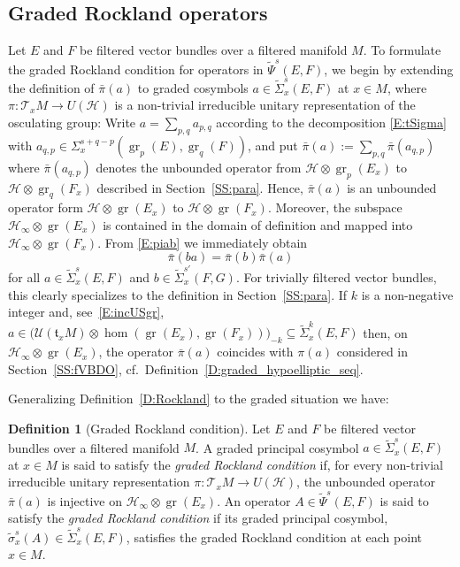 \documentclass[reqno,12pt]{amsart}
\DeclareMathOperator{\gr}{gr}
\theoremstyle{plain}
\theoremstyle{definition}
\newtheorem{definition}[theorem]{Definition}
\begin{document}
\subsection{Graded Rockland operators}






Let $E$ and $F$ be filtered vector bundles over a filtered manifold $M$.
To formulate the graded Rockland condition for operators in $\tilde\Psi^s(E,F)$, we begin by extending the definition of $\bar\pi(a)$ to graded cosymbols $a\in\tilde\Sigma^s_x(E,F)$ at $x\in M$, where $\pi\colon\mathcal T_xM\to U(\mathcal H)$ is a non-trivial irreducible unitary representation of the osculating group:
Write $a=\sum_{p,q}a_{p,q}$ according to the decomposition \eqref{E:tSigma} with $a_{q,p}\in\Sigma^{s+q-p}_x(\gr_p(E),\gr_q(F))$, and put $\bar\pi(a):=\sum_{p,q}\bar\pi(a_{q,p})$ where $\bar\pi(a_{q,p})$ denotes the unbounded operator from $\mathcal H\otimes\gr_p(E_x)$ to $\mathcal H\otimes\gr_q(F_x)$ described in Section~\ref{SS:para}.
Hence, $\bar\pi(a)$ is an unbounded operator form $\mathcal H\otimes\gr(E_x)$ to $\mathcal H\otimes\gr(F_x)$.
Moreover, the subspace $\mathcal H_\infty\otimes\gr(E_x)$ is contained in the domain of definition and mapped into $\mathcal H_\infty\otimes\gr(F_x)$.
From \eqref{E:piab} we immediately obtain 
\begin{equation}\label{E:grpiab}
\bar\pi(ba)=\bar\pi(b)\bar\pi(a)
\end{equation}
for all $a\in\tilde\Sigma^s_x(E,F)$ and $b\in\tilde\Sigma^{s'}_x(F,G)$.
For trivially filtered vector bundles, this clearly specializes to the definition in Section~\ref{SS:para}.
If $k$ is a non-negative integer and, see~\eqref{E:incUSgr}, $a\in\bigl(\mathcal U(\mathfrak t_xM)\otimes\hom(\gr(E_x),\gr(F_x))\bigr)_{-k}\subseteq\tilde\Sigma^k_x(E,F)$ then, on $\mathcal H_\infty\otimes\gr(E_x)$, the operator $\bar\pi(a)$ coincides with $\pi(a)$ considered in Section~\ref{SS:fVBDO}, cf.\ Definition~\ref{D:graded_hypoelliptic_seq}.


Generalizing Definition~\ref{D:Rockland} to the graded situation we have:


\begin{definition}[Graded Rockland condition]\label{D:graded-Rockland}
Let $E$ and $F$ be filtered vector bundles over a filtered manifold $M$.
A graded principal cosymbol $a\in\tilde\Sigma_x^s(E,F)$ at $x\in M$ is said to satisfy the \emph{graded Rockland condition} if, for every non-trivial irreducible unitary representation $\pi\colon\mathcal T_xM\to U(\mathcal H)$, the unbounded operator $\bar\pi(a)$ is injective on $\mathcal H_\infty\otimes\gr(E_x)$.
An operator $A\in\tilde\Psi^s(E,F)$ is said to satisfy the \emph{graded Rockland condition} if its graded principal cosymbol, $\tilde\sigma^s_x(A)\in\tilde\Sigma^s_x(E,F)$, satisfies the graded Rockland condition at each point $x\in M$.
\end{definition}
\end{document}
